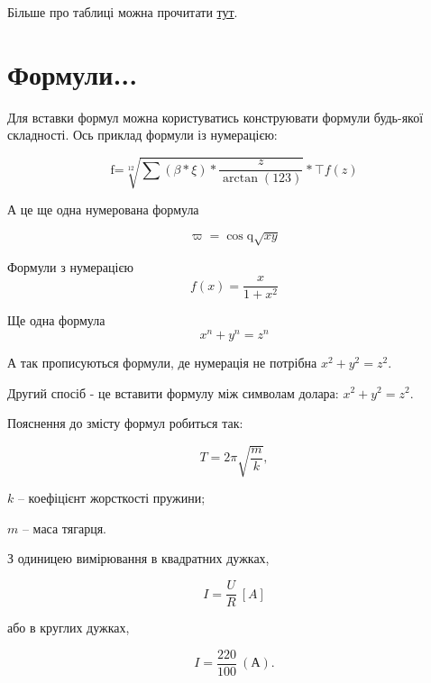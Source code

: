 Більше про таблиці можна прочитати \href{https://www.overleaf.com/learn/latex/Tables}{тут}.

\clearpage{}

\section{Формули...}
Для вставки формул можна користуватись конструювати формули будь-якої складності. Ось приклад формули із нумерацією:

\begin{equation}
	\text{f=}\sqrt[12]{\sum\left(\beta*\xi\right)*\frac{z}{\arctan(123)}}*\top f(z)
\end{equation}

А це ще одна нумерована формула

\begin{equation}
	\varpi=\cos\text{q}\sqrt{{x}{y}}
\end{equation}

Формули з нумерацією    
\begin{equation}
    f(x)=\frac{x}{1+x^2}
\end{equation}

Ще одна формула    
\begin{equation}
    x^n + y^n = z^n
\end{equation}
    
А так прописуються формули, де нумерація не потрібна \(x^2 + y^2 = z^2\).

Другий спосіб - це вставити формулу між символам долара: $x^2 + y^2 = z^2$. 

Пояснення до змісту формул робиться так:

\begin{equation}
T = 2\pi\sqrt{\frac{m}{k}}, 
\end{equation}

\begin{explanation}
\fitem $k$ -- коефіцієнт жорсткості пружини; 
\item $m$ -- маса тягарця.
\end{explanation}

                  
З одиницею вимірювання в квадратних дужках,

\begin{equation}
\label{eq:explan}
I = \frac{U}{R}~[A]
\end{equation}

або в круглих дужках,

$$I = \frac{220}{100}~(\text{А}).$$

